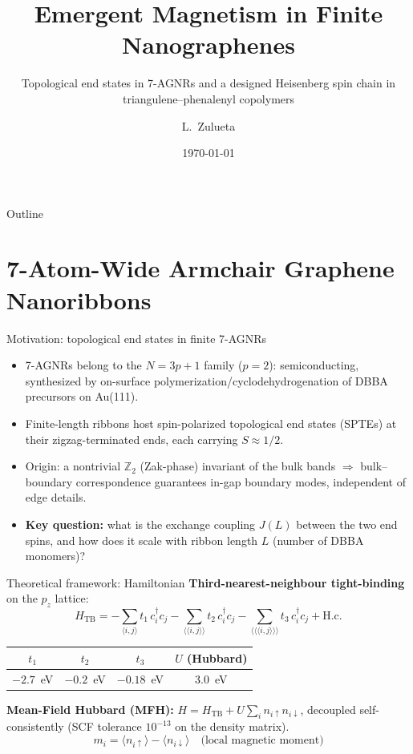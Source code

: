 \documentclass[aspectratio=169,11pt]{beamer}
\title{Emergent Magnetism in Finite Nanographenes}
\subtitle{Topological end states in 7-AGNRs and a designed Heisenberg spin chain in triangulene--phenalenyl copolymers}
\author{L.~Zulueta}
\institute{CIC nanoGUNE, Donostia--San Sebasti\'an, Spain}
\date{\today}
\begin{document}
\maketitle

\begin{frame}{Outline}
  \tableofcontents
\end{frame}

\section{7-Atom-Wide Armchair Graphene Nanoribbons}

\begin{frame}{Motivation: topological end states in finite 7-AGNRs}
  \begin{itemize}
    \item 7-AGNRs belong to the $N=3p+1$ family ($p=2$): semiconducting, synthesized by on-surface polymerization/cyclodehydrogenation of DBBA precursors on Au(111).
    \item Finite-length ribbons host \alert{spin-polarized topological end states} (SPTEs) at their zigzag-terminated ends, each carrying $S \approx 1/2$.
    \item Origin: a nontrivial $\mathbb{Z}_2$ (Zak-phase) invariant of the bulk bands $\Rightarrow$ bulk--boundary correspondence guarantees in-gap boundary modes, independent of edge details.
    \item \textbf{Key question:} what is the exchange coupling $J(L)$ between the two end spins, and how does it scale with ribbon length $L$ (number of DBBA monomers)?
  \end{itemize}
\end{frame}

\begin{frame}{Theoretical framework: Hamiltonian}
  \textbf{Third-nearest-neighbour tight-binding} on the $p_z$ lattice:
  \[
    H_{\mathrm{TB}} = -\sum_{\langle i,j\rangle} t_1\, c_i^\dagger c_j - \sum_{\langle\langle i,j\rangle\rangle} t_2\, c_i^\dagger c_j - \sum_{\langle\langle\langle i,j\rangle\rangle\rangle} t_3\, c_i^\dagger c_j + \mathrm{H.c.}
  \]
  \begin{center}
  \begin{tabular}{cccc}
    \toprule
    $t_1$ & $t_2$ & $t_3$ & $U$ (Hubbard) \\
    \midrule
    $-2.7$~eV & $-0.2$~eV & $-0.18$~eV & $3.0$~eV \\
    \bottomrule
  \end{tabular}
  \end{center}
  \textbf{Mean-Field Hubbard (MFH):} $H = H_{\mathrm{TB}} + U\sum_i n_{i\uparrow} n_{i\downarrow}$, decoupled self-consistently (SCF tolerance $10^{-13}$ on the density matrix).
  \[
    m_i = \langle n_{i\uparrow}\rangle-\langle n_{i\downarrow}\rangle \quad\text{(local magnetic moment)}
  \]
\end{frame}
\end{document}
